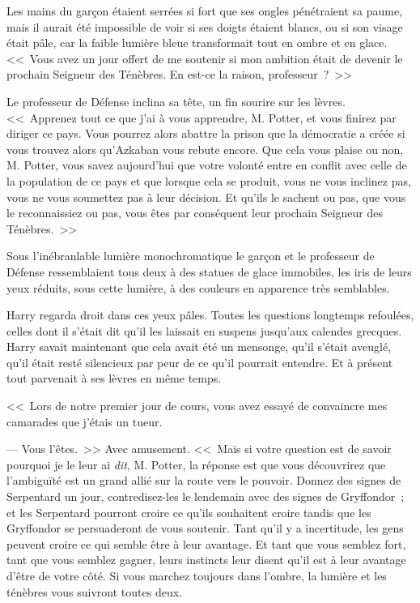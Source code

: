 Les mains du garçon étaient serrées si fort que ses ongles pénétraient sa paume, mais il aurait été impossible de voir si ses doigts étaient blancs, ou si son visage était pâle, car la faible lumière bleue transformait tout en ombre et en glace. <<~Vous avez un jour offert de me soutenir si mon ambition était de devenir le prochain Seigneur des Ténèbres. En est-ce la raison, professeur~?~>>

Le professeur de Défense inclina sa tête, un fin sourire sur les lèvres. <<~Apprenez tout ce que j'ai à vous apprendre, M. Potter, et vous finirez par diriger ce pays. Vous pourrez alors abattre la prison que la démocratie a créée si vous trouvez alors qu'Azkaban vous rebute encore. Que cela vous plaise ou non, M. Potter, vous savez aujourd'hui que votre volonté entre en conflit avec celle de la population de ce pays et que lorsque cela se produit, vous ne vous inclinez pas, vous ne vous soumettez pas à leur décision. Et qu'ils le sachent ou pas, que vous le reconnaissiez ou pas, vous êtes par conséquent leur prochain Seigneur des Ténèbres.~>>

Sous l'inébranlable lumière monochromatique le garçon et le professeur de Défense ressemblaient tous deux à des statues de glace immobiles, les iris de leurs yeux réduits, sous cette lumière, à des couleurs en apparence très semblables.

Harry regarda droit dans ces yeux pâles. Toutes les questions longtemps refoulées, celles dont il s'était dit qu'il les laissait en suspens jusqu'aux calendes grecques. Harry savait maintenant que cela avait été un mensonge, qu'il s'était aveuglé, qu'il était resté silencieux par peur de ce qu'il pourrait entendre. Et à présent tout parvenait à ses lèvres en même temps.

<<~Lors de notre premier jour de cours, vous avez essayé de convaincre mes camarades que j'étais un tueur.

--- Vous l'êtes.~>> Avec amusement. <<~Mais si votre question est de savoir pourquoi je le leur ai \emph{dit}, M. Potter, la réponse est que vous découvrirez que l'ambiguïté est un grand allié sur la route vers le pouvoir. Donnez des signes de Serpentard un jour, contredisez-les le lendemain avec des signes de Gryffondor~; et les Serpentard pourront croire ce qu'ils souhaitent croire tandis que les Gryffondor se persuaderont de vous soutenir. Tant qu'il y a incertitude, les gens peuvent croire ce qui semble être à leur avantage. Et tant que vous semblez fort, tant que vous semblez gagner, leurs instincts leur disent qu'il est à leur avantage d'être de votre côté. Si vous marchez toujours dans l'ombre, la lumière et les ténèbres vous suivront toutes deux.

